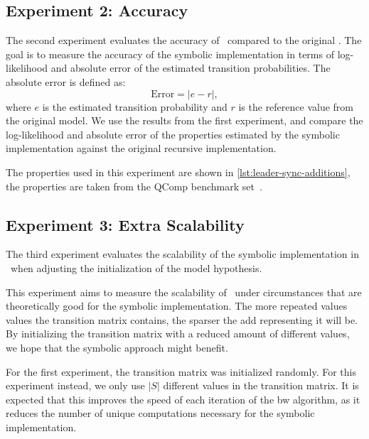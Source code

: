 \subsection{Experiment 2: Accuracy}\label{sec:exp_accuracy}
The second experiment evaluates the accuracy of \JajapyTwo\ compared to the original \Jajapy.
The goal is to measure the accuracy of the symbolic implementation in terms of log-likelihood and absolute error of the estimated transition probabilities.
The absolute error is defined as:
\[
    \text{Error} = |e - r|,
\]
where $e$ is the estimated transition probability and $r$ is the reference value from the original model.
We use the results from the first experiment, and compare the log-likelihood and absolute error of the properties estimated by the symbolic implementation against the original recursive implementation.

The properties used in this experiment are shown in \autoref{lst:leader-sync-additions}, the properties are taken from the QComp benchmark set~\cite{hartmanns2019quantitative}.


\subsection{Experiment 3: Extra Scalability}\label{sec:exp_extra_scalability}
The third experiment evaluates the scalability of the symbolic implementation in \JajapyTwo\ when adjusting the initialization of the model hypothesis.

This experiment aims to measure the scalability of \JajapyTwo\ under circumstances that are theoretically good for the symbolic implementation.
The more repeated values values the transition matrix contains, the sparser the \gls{add} representing it will be.
By initializing the transition matrix with a reduced amount of different values, we hope that the symbolic approach might benefit.

For the first experiment, the transition matrix was initialized randomly.
For this experiment instead, we only use $|S|$ different values in the transition matrix.
It is expected that this improves the speed of each iteration of the \gls{bw} algorithm, as it reduces the number of unique computations necessary for the symbolic implementation.
